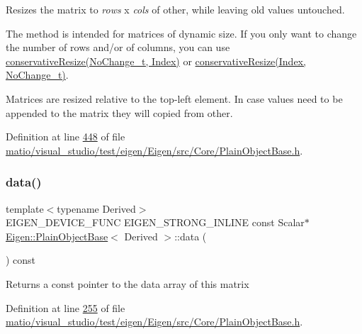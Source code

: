 Resizes the matrix to {\itshape rows} x {\itshape cols} of {\ttfamily other}, while leaving old values untouched.

The method is intended for matrices of dynamic size. If you only want to change the number of rows and/or of columns, you can use \hyperlink{class_eigen_1_1_plain_object_base_a46afa73816539b0fe36c6e9abd7978a6}{conservative\+Resize(\+No\+Change\+\_\+t, Index)} or \hyperlink{class_eigen_1_1_plain_object_base_a528879aef40f9cbc4ab4925e4a6bceb9}{conservative\+Resize(\+Index, No\+Change\+\_\+t)}.

Matrices are resized relative to the top-\/left element. In case values need to be appended to the matrix they will copied from {\ttfamily other}. 

Definition at line \hyperlink{matio_2visual__studio_2test_2eigen_2_eigen_2src_2_core_2_plain_object_base_8h_source_l00448}{448} of file \hyperlink{matio_2visual__studio_2test_2eigen_2_eigen_2src_2_core_2_plain_object_base_8h_source}{matio/visual\+\_\+studio/test/eigen/\+Eigen/src/\+Core/\+Plain\+Object\+Base.\+h}.

\mbox{\label{class_eigen_1_1_plain_object_base_ac25699535374b1854cf8494e44ad31b2}} 
\subsubsection{\texorpdfstring{data()}{data()}\hspace{0.1cm}{\footnotesize\ttfamily [1/4]}}
{\footnotesize\ttfamily template$<$typename Derived$>$ \\
E\+I\+G\+E\+N\+\_\+\+D\+E\+V\+I\+C\+E\+\_\+\+F\+U\+NC E\+I\+G\+E\+N\+\_\+\+S\+T\+R\+O\+N\+G\+\_\+\+I\+N\+L\+I\+NE const Scalar$\ast$ \hyperlink{class_eigen_1_1_plain_object_base}{Eigen\+::\+Plain\+Object\+Base}$<$ Derived $>$\+::data (\begin{DoxyParamCaption}{ }\end{DoxyParamCaption}) const\hspace{0.3cm}{\ttfamily [inline]}}

\begin{DoxyReturn}{Returns}
a const pointer to the data array of this matrix 
\end{DoxyReturn}


Definition at line \hyperlink{matio_2visual__studio_2test_2eigen_2_eigen_2src_2_core_2_plain_object_base_8h_source_l00255}{255} of file \hyperlink{matio_2visual__studio_2test_2eigen_2_eigen_2src_2_core_2_plain_object_base_8h_source}{matio/visual\+\_\+studio/test/eigen/\+Eigen/src/\+Core/\+Plain\+Object\+Base.\+h}.


